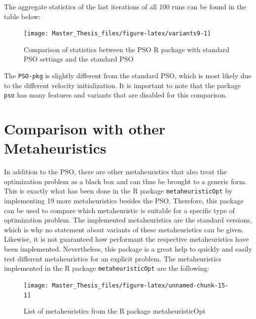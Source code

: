 \documentclass[
  oneside, a4paper, 12pt, openany]{book}
\theoremstyle{definition}
\theoremstyle{definition}
\theoremstyle{definition}
\theoremstyle{definition}
\theoremstyle{remark}
\begin{document}
\vspace{-0.1cm}

The aggregate statistics of the last iterations of all 100 runs can be found in the table below:
\vspace{-0.2cm}

\begin{figure}[H]
\texttt{[image: Master\_Thesis\_files/figure-latex/variants9-1]} \caption{Comparison of statistics between the PSO R package with standard PSO settings and the standard PSO}\label{fig:variants9}
\end{figure}
\vspace{-0.5cm}

The \texttt{PSO-pkg} is slightly different from the standard PSO, which is most likely due to the different velocity initialization. It is important to note that the package \texttt{pso} has many features and variants that are disabled for this comparison.

\hypertarget{comparison-with-other-metaheuristics}{%
\section{Comparison with other Metaheuristics}\label{comparison-with-other-metaheuristics}}

In addition to the PSO, there are other metaheuristics that also treat the optimization problem as a black box and can thus be brought to a generic form. This is exactly what has been done in the R package \texttt{metaheuristicOpt} by implementing 19 more metaheuristics besides the PSO. Therefore, this package can be used to compare which metaheuristic is suitable for a specific type of optimization problem. The implemented metaheuristics are the standard versions, which is why no statement about variants of these metaheuristics can be given. Likewise, it is not guaranteed how performant the respective metaheuristics have been implemented. Nevertheless, this package is a great help to quickly and easily test different metaheuristics for an explicit problem. The metaheuristics implemented in the R package \texttt{metaheuristicOpt} are the following:

\begin{figure}[H]
\texttt{[image: Master\_Thesis\_files/figure-latex/unnamed-chunk-15-1]} \caption{List of metaheuristics from the R package metaheuristicOpt}\label{fig:unnamed-chunk-15}
\end{figure}
\end{document}
